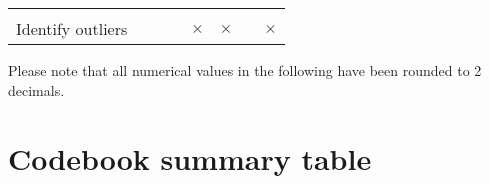 \documentclass[]{article}
\begin{document}
\begin{longtable}[]{@{}lccccccc@{}}
\begin{minipage}[t]{0.06\columnwidth}
\strut
\end{minipage}\tabularnewline
\begin{minipage}[t]{0.33\columnwidth}\raggedright\strut
Identify outliers\strut
\end{minipage} & \begin{minipage}[t]{0.07\columnwidth}\centering\strut
\strut
\end{minipage} & \begin{minipage}[t]{0.07\columnwidth}\centering\strut
\strut
\end{minipage} & \begin{minipage}[t]{0.07\columnwidth}\centering\strut
\strut
\end{minipage} & \begin{minipage}[t]{0.07\columnwidth}\centering\strut
\(\times\)\strut
\end{minipage} & \begin{minipage}[t]{0.07\columnwidth}\centering\strut
\(\times\)\strut
\end{minipage} & \begin{minipage}[t]{0.06\columnwidth}\centering\strut
\strut
\end{minipage} & \begin{minipage}[t]{0.06\columnwidth}\centering\strut
\(\times\)\strut
\end{minipage}\tabularnewline
\bottomrule
\end{longtable}

Please note that all numerical values in the following have been rounded
to 2 decimals.

\section{Codebook summary table}\label{codebook-summary-table}
\end{document}
